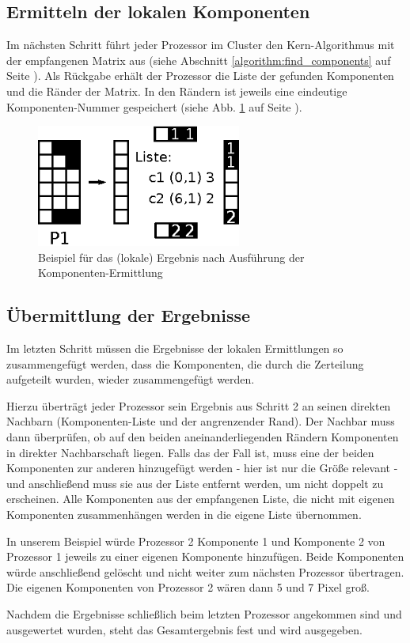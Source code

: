 \subsection{Ermitteln der lokalen Komponenten}

Im nächsten Schritt führt jeder Prozessor im Cluster den Kern-Algorithmus mit der empfangenen Matrix aus (siehe Abschnitt \ref{algorithm:find_components} auf Seite \pageref{algorithm:find_components}). Als Rückgabe erhält der Prozessor die Liste der gefunden Komponenten und die Ränder der Matrix. In den Rändern ist jeweils eine eindeutige Komponenten-Nummer gespeichert (siehe Abb. \ref{fig:find_result} auf Seite \pageref{fig:find_result}).

\begin{figure}[tbhp]
	\centering
	\includegraphics[width=0.6\textwidth]{images/find_result.eps}
	\caption{Beispiel für das (lokale) Ergebnis nach Ausführung der Komponenten-Ermittlung}
	\label{fig:find_result}
\end{figure}

\subsection{Übermittlung der Ergebnisse}

Im letzten Schritt müssen die Ergebnisse der lokalen Ermittlungen so zusammengefügt werden, dass die Komponenten, die durch die Zerteilung aufgeteilt wurden, wieder zusammengefügt werden.

Hierzu überträgt jeder Prozessor sein Ergebnis aus Schritt 2 an seinen direkten Nachbarn (Komponenten-Liste und der angrenzender Rand). Der Nachbar muss dann überprüfen, ob auf den beiden aneinanderliegenden Rändern Komponenten in direkter Nachbarschaft liegen. Falls das der Fall ist, muss eine der beiden Komponenten zur anderen hinzugefügt werden - hier ist nur die Größe relevant - und anschließend muss sie aus der Liste entfernt werden, um nicht doppelt zu erscheinen. Alle Komponenten aus der empfangenen Liste, die nicht mit eigenen Komponenten zusammenhängen werden in die eigene Liste übernommen.

In unserem Beispiel würde Prozessor 2 Komponente 1 und Komponente 2 von Prozessor 1 jeweils zu einer eigenen Komponente hinzufügen. Beide Komponenten würde anschließend gelöscht und nicht weiter zum nächsten Prozessor übertragen. Die eigenen Komponenten von Prozessor 2 wären dann 5 und 7 Pixel groß.

Nachdem die Ergebnisse schließlich beim letzten Prozessor angekommen sind und ausgewertet wurden, steht das Gesamtergebnis fest und wird ausgegeben.